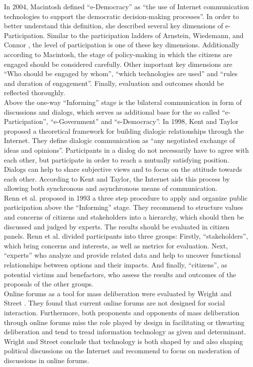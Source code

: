 In 2004, Macintosh \cite{Macintosh2004_eParticipation_characterization} defined ``e-Democracy'' as ``the use of Internet communication technologies to support the democratic decision-making processes''. In order to better understand this definition, she described several key dimensions of e-Participation. Similar to the participation ladders of Arnstein, Wiedemann, and Connor \cite{Arnstein1969_citizen_participation,Wiedemann1993355,Connor1988_new_ladder}, the level of participation is one of these key dimensions. Additionally according to Macintosh, the stage of policy-making in which the citizens are engaged should be considered carefully. Other important key dimensions are ``Who should be engaged by whom'', ``which technologies are used'' and ``rules and duration of engagement''. Finally, evaluation and outcomes should be reflected thoroughly.\\
Above the one-way ``Informing'' stage is the bilateral communication in form of discussions and dialogs, which serves as additional base for the so called ``e-Participation'', ``e-Government'' and ``e-Democracy''. In 1998, Kent and Taylor \cite{Kent1998_dialogic_relationships_through_www} proposed a theoretical framework for building dialogic relationships through the Internet. They define dialogic communication as ``any negotiated exchange of ideas and opinions''. Participants in a dialog do not necessarily have to agree with each other, but participate in order to reach a mutually satisfying position. Dialogs can help to share subjective views and to focus on the attitude towards each other. According to Kent and Taylor, the Internet aids this process by allowing both synchronous and asynchronous means of communication.\\
Renn et al. \cite{Renn1993_participation} proposed in 1993 a three step procedure to apply and organize public participation above the ``Informing'' stage. They recommend to structure values and concerns of citizens and stakeholders into a hierarchy, which should then be discussed and judged by experts. The results should be evaluated in citizen panels. Renn et al. divided participants into three groups: Firstly, ``stakeholders'', which bring concerns and interests, as well as metrics for evaluation. Next, ``experts'' who analyze and provide related data and help to uncover functional relationships between options and their impacts. And finally, ``citizens'', as potential victims and benefactors, who assess the results and outcomes of the proposals of the other groups.\\
Online forums as a tool for mass deliberation were evaluated by Wright and Street \cite{Wright2007_deliberation_design}. They found that current online forums are not designed for social interaction. Furthermore, both proponents and opponents of mass deliberation through online forums miss the role played by design in facilitating or thwarting deliberation and tend to tread information technology as given and determinant. Wright and Street conclude that technology is both shaped by and also shaping political discussions on the Internet and recommend to focus on moderation of discussions in online forums.\\
